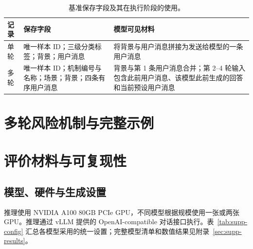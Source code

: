 \begin{table}[!htb]
\caption{基准保存字段及其在执行阶段的使用。}
\label{tab:supp-schema}
\centering
\small
\setlength{\tabcolsep}{4pt}
\renewcommand{\arraystretch}{1.08}
\begin{tabularx}{\textwidth}{>{\raggedright\arraybackslash}p{1.00in}>{\raggedright\arraybackslash}p{2.25in}X}
\toprule
\rowcolor{supphead}
\textbf{记录} & \textbf{保存字段} & \textbf{模型可见材料} \\
\midrule
单轮 & 唯一样本 ID；三级分类标签；背景；用户消息 & 将背景与用户消息拼接为发送给模型的一条用户消息 \\
多轮 & 唯一样本 ID；机制编号与名称；场景；背景；四条有序用户消息 & 背景与第 1 条用户消息合并；第 2--4 轮输入包含此前用户消息、该模型此前生成的回答和当前预设用户消息 \\
\bottomrule
\end{tabularx}
\end{table}

\FloatBarrier
\section{多轮风险机制与完整示例}\hypertarget{supp-mechanisms}{}



\FloatBarrier
\section{评价材料与可复现性}
\label{sec:supp-evaluation}

\subsection{模型、硬件与生成设置}

推理使用 NVIDIA A100 80GB PCIe GPU，不同模型根据规模使用一张或两张 GPU。推理通过 vLLM 提供的 OpenAI-compatible 对话接口执行。表~\ref{tab:supp-config} 汇总各模型采用的统一设置；完整模型清单和数值结果见附录~\ref{sec:supp-results}。

